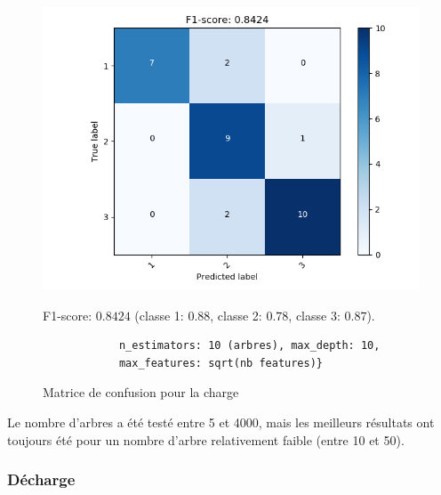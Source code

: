 \begin{figure}['h!']
    \centering
    \includegraphics[scale=0.65]{images/rf/cm_charge.png}
    \caption{Matrice de confusion pour la charge}
    \label{fig:RFCMcharge}
    \begin{center}
        F1-score: $0.8424$ (classe 1: $0.88$, classe 2: $0.78$, classe 3: $0.87$).
        \begin{verbatim}
            n_estimators: 10 (arbres), max_depth: 10,
            max_features: sqrt(nb features)}
        \end{verbatim}
    \end{center}
\end{figure}

Le nombre d'arbres a été testé entre 5 et 4000, mais les meilleurs résultats ont toujours été pour un nombre d'arbre relativement faible (entre 10 et 50).

\subsubsection{Décharge}

